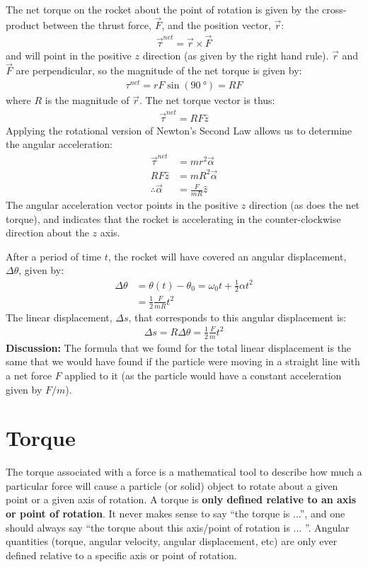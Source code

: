 \begin{example}
The net torque on the rocket about the point of rotation is given by the cross-product between the thrust force, $\vec F$, and the position vector, $\vec r$:
\begin{align*}
\vec\tau^{net} = \vec r\times\vec F
\end{align*}
and will point in the positive $z$ direction (as given by the right hand rule). $\vec r$ and $\vec F$ are perpendicular, so the magnitude of the net torque is given by:
\begin{align*}
\tau^{net} = rF \sin(\SI{90}{\degree}) = RF
\end{align*}
where $R$ is the magnitude of $\vec r$. The net torque vector is thus:
\begin{align*}
\vec\tau^{net} = RF \hat z
\end{align*}
Applying the rotational version of Newton's Second Law allows us to determine the angular acceleration:
\begin{align*}
\vec \tau ^{net} &= mr^2\vec\alpha\\
RF \hat z&= mR^2\vec\alpha\\
\therefore \vec \alpha &= \frac{F}{mR}\hat z
\end{align*}
The angular acceleration vector points in the positive $z$ direction (as does the net torque), and indicates that the rocket is accelerating in the counter-clockwise direction about the $z$ axis. 

After a period of time $t$, the rocket will have covered an angular displacement, $\Delta \theta$, given by:
\begin{align*}
\Delta \theta &= \theta(t)-\theta_0 = \omega_0t + \frac{1}{2}\alpha t^2\\
&=\frac{1}{2}\frac{F}{mR} t^2
\end{align*}
The linear displacement, $\Delta s$, that corresponds to this angular displacement is:
\begin{align*}
\Delta s = R \Delta\theta = \frac{1}{2}\frac{F}{m} t^2
\end{align*}
\textbf{Discussion:} The formula that we found for the total linear displacement is the same that we would have found if the particle were moving in a straight line with a net force $F$ applied to it (as the particle would have a constant acceleration given by $F/m$).
\end{example}


\section{Torque}
\label{sec:rotationaldynamics:torque}
The torque associated with a force is a mathematical tool to describe how much a particular force will cause a particle (or solid) object to rotate about a given point or a given axis of rotation. A torque is \textbf{only defined relative to an axis or point of rotation}. It never makes sense to say ``the torque is ...'', and one should always say ``the torque about this axis/point of rotation is ... ''. Angular quantities (torque, angular velocity, angular displacement, etc) are only ever defined relative to a specific axis or point of rotation.

